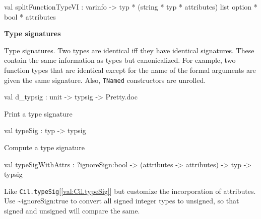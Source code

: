 \documentclass[11pt]{article}
\begin{document}
\label{val:Cil.splitFunctionTypeVI}\begin{ocamldoccode}
val splitFunctionTypeVI :
  varinfo ->
  typ * (string * typ * attributes) list option * bool *
  attributes
\end{ocamldoccode}




{\bf Type signatures}



Type signatures. Two types are identical iff they have identical 
 signatures. These contain the same information as types but canonicalized. 
 For example, two function types that are identical except for the name of 
 the formal arguments are given the same signature. Also, {\tt{TNamed}} 
 constructors are unrolled.



\label{val:Cil.d-underscoretypsig}\begin{ocamldoccode}
val d_typsig : unit -> typsig -> Pretty.doc
\end{ocamldoccode}
\begin{ocamldocdescription}
Print a type signature


\end{ocamldocdescription}




\label{val:Cil.typeSig}\begin{ocamldoccode}
val typeSig : typ -> typsig
\end{ocamldoccode}
\begin{ocamldocdescription}
Compute a type signature


\end{ocamldocdescription}




\label{val:Cil.typeSigWithAttrs}\begin{ocamldoccode}
val typeSigWithAttrs :
  ?ignoreSign:bool ->
  (attributes -> attributes) -> typ -> typsig
\end{ocamldoccode}
\begin{ocamldocdescription}
Like {\tt{Cil.typeSig}}[\ref{val:Cil.typeSig}] but customize the incorporation of attributes.
    Use \~{}ignoreSign:true to convert all signed integer types to unsigned,
    so that signed and unsigned will compare the same.


\end{ocamldocdescription}
\end{document}
